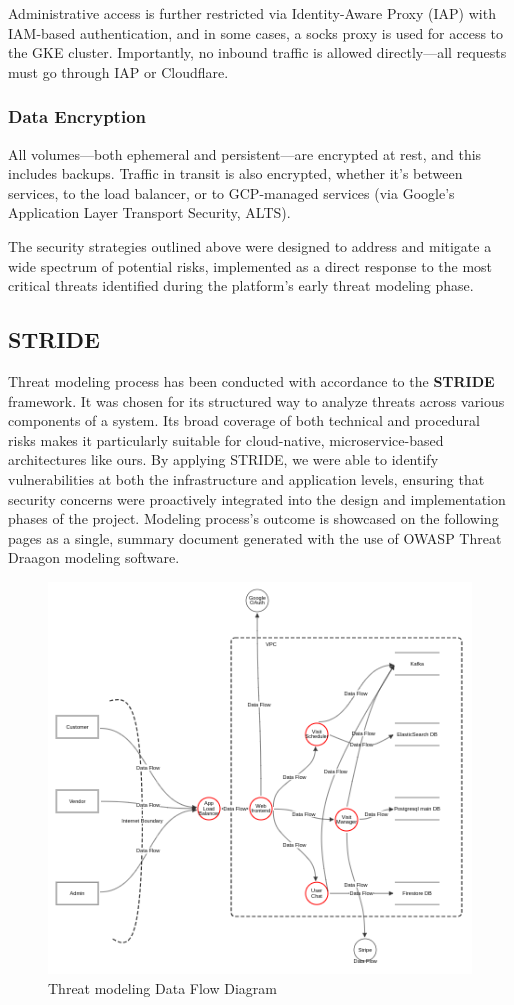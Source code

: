 \documentclass[11pt,a4paper]{article}
\begin{document}
Administrative access is further restricted via Identity-Aware Proxy (IAP) with IAM-based authentication, and in some cases, a socks proxy is used for access to the GKE cluster. Importantly, no inbound traffic is allowed directly—all requests must go through IAP or Cloudflare.

\subsubsection{Data Encryption}

All volumes—both ephemeral and persistent—are encrypted at rest, and this includes backups. Traffic in transit is also encrypted, whether it’s between services, to the load balancer, or to GCP-managed services (via Google’s Application Layer Transport Security, ALTS).

The security strategies outlined above were designed to address and mitigate a wide spectrum of potential risks, implemented as a direct response to the most critical threats identified during the platform's early threat modeling phase.

\subsection{STRIDE}

Threat modeling process has been conducted with accordance to the \textbf{STRIDE} framework.  
It was chosen for its structured way to analyze threats across various components of a system. Its broad coverage of both technical and procedural risks makes it particularly suitable for cloud-native, microservice-based architectures like ours. By applying STRIDE, we were able to identify vulnerabilities at both the infrastructure and application levels, ensuring that security concerns were proactively integrated into the design and implementation phases of the project.
Modeling process's outcome is showcased on the following pages as a single, summary document generated with the use of OWASP Threat Draagon modeling software. 

\begin{figure}[H]
  \centering
  \includegraphics[width=\textwidth]{DFD-threat-model.png}
  \caption{Threat modeling Data Flow Diagram}
  \label{fig:DFD-threat-model}
\end{figure}


\end{document}
